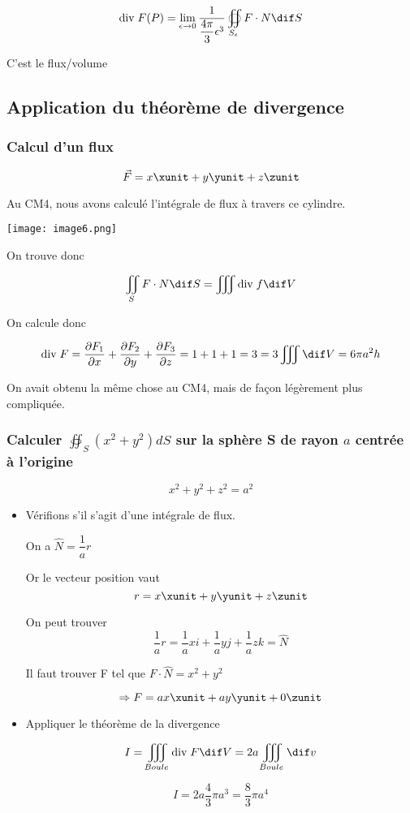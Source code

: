 \[\divt F (P) =  \lim_{\epsilon \to 0 } \frac{1}{\dfrac{4\pi}{3} \epsilon^3} \oiint _{S_{\epsilon}} F \cdot N \dif S \]

C'est le flux/volume

\subsection{Application du théorème de divergence}

\subsubsection{Calcul d'un flux}
\[\vec F = x \xunit + y \yunit + z \zunit \]

Au CM4, nous avons calculé l'intégrale de flux à travers ce cylindre.

\texttt{[image: image6.png]}

On trouve donc

\[\iint_S F \cdot N \dif S = \iiint \divt f \dif V\]

On calcule donc

\[\divt F = \frac{\partial F_1}{\partial x}+ \frac{\partial F_2}{\partial y} + \frac{\partial F_3}{\partial z}= 1+1+1=3 = 3 \iiint \dif V = 6 \pi a^2 h\]

On avait obtenu la même chose au CM4, mais de façon légèrement plus compliquée.

\subsubsection{Calculer $\oiint_S(x^2+y^2)dS$ sur la sphère S de rayon $a$ centrée à l'origine}

\[x^2+y^2+z^2 = a^2\]

\begin{itemize}

\item Vérifions s'il s'agit d'une intégrale de flux.

On a $\hat N = \dfrac{1}{a} r $

Or le vecteur position vaut
\[r = x\xunit +y\yunit +z\zunit\]

On peut trouver
\[\dfrac{1}{a}r = \dfrac{1}{a}xi +\dfrac{1}{a}yj +\dfrac{1}{a}zk = \hat N\]

Il faut trouver F tel que $F\cdot \hat N = x^2 + y ^2 $

\[\Rightarrow F = ax\xunit +ay\yunit +0\zunit \]
\item Appliquer le théorème de la divergence

$$ I = \iiint_{Boule} \divt F \dif V = 2a \iiint_{Boule}\dif v$$

\[I = 2a \dfrac{4}{3}\pi a^3 = \dfrac{8}{3}\pi a^4\]
\end{itemize}

